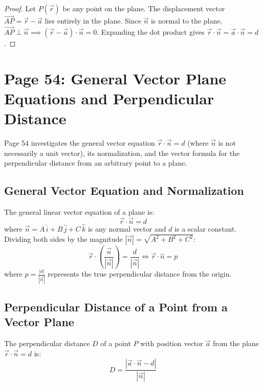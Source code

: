 \begin{proof}
Let $P(\vec{r})$ be any point on the plane.
The displacement vector $\vec{AP} = \vec{r} - \vec{a}$ lies entirely in the plane.
Since $\vec{n}$ is normal to the plane, $\vec{AP} \perp \vec{n} \implies (\vec{r} - \vec{a}) \cdot \vec{n} = 0$.
Expanding the dot product gives $\vec{r} \cdot \vec{n} = \vec{a} \cdot \vec{n} = d$.
\end{proof}

\section{Page 54: General Vector Plane Equations and Perpendicular Distance}
\label{sec:page54}

\begin{conceptbox}
Page 54 investigates the general vector equation $\vec{r} \cdot \vec{n} = d$ (where $\vec{n}$ is not necessarily a unit vector), its normalization, and the vector formula for the perpendicular distance from an arbitrary point to a plane.
\end{conceptbox}

\subsection{General Vector Equation and Normalization}
The general linear vector equation of a plane is:
\begin{equation}
    \vec{r} \cdot \vec{n} = d
\end{equation}
where $\vec{n} = A\,\hat{i} + B\,\hat{j} + C\,\hat{k}$ is any normal vector and $d$ is a scalar constant.
Dividing both sides by the magnitude $|\vec{n}| = \sqrt{A^2 + B^2 + C^2}$:
\begin{equation}
    \vec{r} \cdot \left(\frac{\vec{n}}{|\vec{n}|}\right) = \frac{d}{|\vec{n}|} \iff \vec{r} \cdot \hat{n} = p
\end{equation}
where $p = \frac{|d|}{|\vec{n}|}$ represents the true perpendicular distance from the origin.

\subsection{Perpendicular Distance of a Point from a Vector Plane}
\begin{theorembox}
The perpendicular distance $D$ of a point $P$ with position vector $\vec{a}$ from the plane $\vec{r} \cdot \vec{n} = d$ is:
\begin{equation}
    \boxed{D = \frac{|\vec{a} \cdot \vec{n} - d|}{|\vec{n}|}}
\end{equation}
\end{theorembox}

